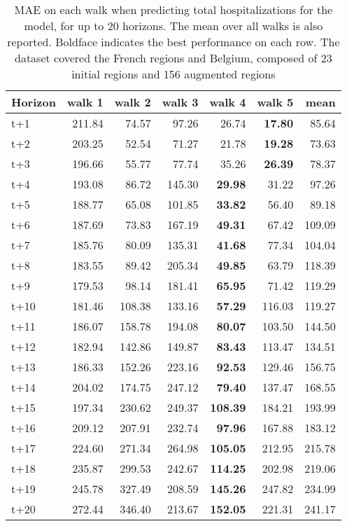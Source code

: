 \begin{table}[H]
\centering
\caption{MAE on each walk when predicting total hospitalizations for the model, for up to 20 horizons. The mean over all walks is also reported. Boldface indicates the best performance on each row. The dataset covered the French regions and Belgium, composed of 23 initial regions and 156 augmented regions }
\label{tab:MAE_walk_dense_model}
\begin{tabular}{lrrrrrr}
\toprule
Horizon &  walk 1 &  walk 2 &  walk 3 &  walk 4 &  walk 5 &   mean \\
\midrule
t+1  & 211.84  & 74.57  & 97.26  & 26.74  & \textbf{17.80}  & 85.64  \\
t+2  & 203.25  & 52.54  & 71.27  & 21.78  & \textbf{19.28}  & 73.63  \\
t+3  & 196.66  & 55.77  & 77.74  & 35.26  & \textbf{26.39}  & 78.37  \\
t+4  & 193.08  & 86.72  & 145.30  & \textbf{29.98}  & 31.22  & 97.26  \\
t+5  & 188.77  & 65.08  & 101.85  & \textbf{33.82}  & 56.40  & 89.18  \\
t+6  & 187.69  & 73.83  & 167.19  & \textbf{49.31}  & 67.42  & 109.09  \\
t+7  & 185.76  & 80.09  & 135.31  & \textbf{41.68}  & 77.34  & 104.04  \\
t+8  & 183.55  & 89.42  & 205.34  & \textbf{49.85}  & 63.79  & 118.39  \\
t+9  & 179.53  & 98.14  & 181.41  & \textbf{65.95}  & 71.42  & 119.29  \\
t+10  & 181.46  & 108.38  & 133.16  & \textbf{57.29}  & 116.03  & 119.27  \\
t+11  & 186.07  & 158.78  & 194.08  & \textbf{80.07}  & 103.50  & 144.50  \\
t+12  & 182.94  & 142.86  & 149.87  & \textbf{83.43}  & 113.47  & 134.51  \\
t+13  & 186.33  & 152.26  & 223.16  & \textbf{92.53}  & 129.46  & 156.75  \\
t+14  & 204.02  & 174.75  & 247.12  & \textbf{79.40}  & 137.47  & 168.55  \\
t+15  & 197.34  & 230.62  & 249.37  & \textbf{108.39}  & 184.21  & 193.99  \\
t+16  & 209.12  & 207.91  & 232.74  & \textbf{97.96}  & 167.88  & 183.12  \\
t+17  & 224.60  & 271.34  & 264.98  & \textbf{105.05}  & 212.95  & 215.78  \\
t+18  & 235.87  & 299.53  & 242.67  & \textbf{114.25}  & 202.98  & 219.06  \\
t+19  & 245.78  & 327.49  & 208.59  & \textbf{145.26}  & 247.82  & 234.99  \\
t+20  & 272.44  & 346.40  & 213.67  & \textbf{152.05}  & 221.31  & 241.17  \\

\bottomrule
\end{tabular}
\end{table}
